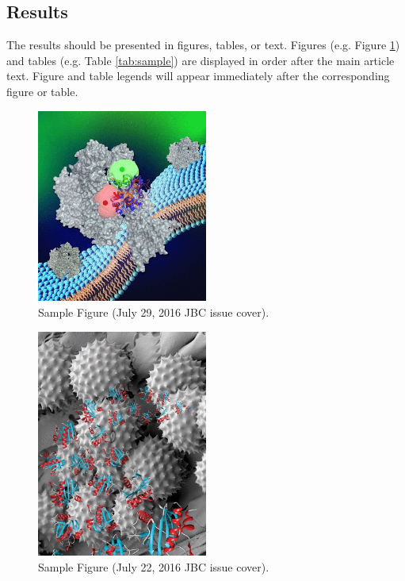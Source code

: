 \documentclass[alpha-refs]{wiley-article}
\begin{document}
\begin{article}
\section{Results}

The results should be presented in figures, tables, or text. Figures (e.g. Figure \ref{fig:july29cover}) and tables (e.g. Table \ref{tab:sample}) are displayed in order after the main article text. Figure and table legends will appear immediately after the corresponding figure or table.

\begin{figure}[hbtp!]\centering
\includegraphics[width=0.5\textwidth]{figures/jbc-cover-20160729.jpg}
\caption{Sample Figure (July 29, 2016 JBC issue cover).}
\label{fig:july29cover}
\end{figure}

\begin{figure}[hbtp!]\centering
\includegraphics[width=0.5\textwidth]{figures/jbc-cover-20160722.jpg}
\caption{Sample Figure (July 22, 2016 JBC issue cover).}
\label{fig:july22cover}
\end{figure}


\end{article}
\end{document}
